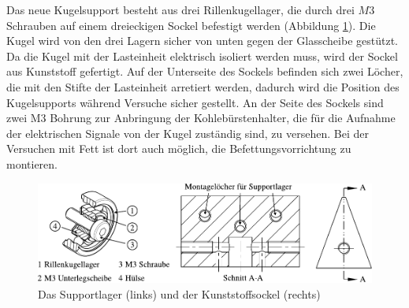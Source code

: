 Das neue Kugelsupport besteht aus drei Rillenkugellager, die durch drei $M3$ Schrauben auf einem dreieckigen Sockel befestigt werden (Abbildung \ref{fig:das_modifizierte_kugelsupport}).
Die Kugel wird von den drei Lagern sicher von unten gegen der Glasscheibe gestützt.
Da die Kugel mit der Lasteinheit elektrisch isoliert werden muss, wird der Sockel aus Kunststoff gefertigt.
Auf der Unterseite des Sockels befinden sich zwei Löcher, die mit den Stifte der Lasteinheit arretiert werden, dadurch wird die Position des Kugelsupports während Versuche sicher gestellt.
An der Seite des Sockels sind zwei M3 Bohrung zur Anbringung der Kohlebürstenhalter, die für die Aufnahme der elektrischen Signale von der Kugel zuständig sind, zu versehen.
Bei der Versuchen mit Fett ist dort auch möglich, die Befettungsvorrichtung zu montieren.
\begin{figure}[htb]
    \centering
    \includegraphics[]{./images/kugelsupport.pdf}
    \caption{Das Supportlager (links) und der Kunststoffsockel (rechts)}
    \label{fig:das_modifizierte_kugelsupport}
\end{figure}
%

